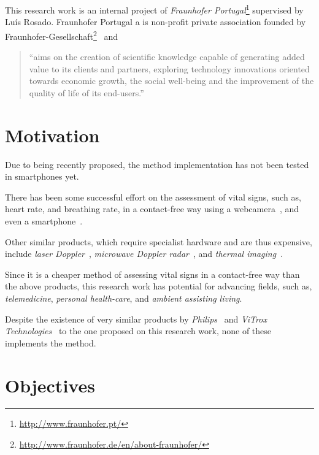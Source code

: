 This research work is an internal project of \emph{Fraunhofer
Portugal}\footnote{\url{http://www.fraunhofer.pt/}} supervised by
Luís Rosado. Fraunhofer Portugal a is non-profit private association
founded by Fraunhofer-Gesellschaft\footnote{\url{http://www.fraunhofer.de/en/about-fraunhofer/}}~\cite{Fraunhofer2013} and

\begin{quote}
  ``aims on the creation of scientific knowledge capable of
  generating added value to its clients and partners, exploring
  technology innovations oriented towards economic growth, the
  social well-being and the improvement of the quality of life of
  its end-users.''~\cite{Fraunhofer2013}
\end{quote}

\section{Motivation} \label{sec:intro:motivation}


Due to being recently proposed, the \evm{} method implementation
has not been tested in smartphones yet.

There has been some successful effort on the assessment of vital
signs, such as, heart rate, and breathing rate, in a contact-free
way using a webcamera~\cite{Wu2012Eulerian, Poh2010Non, Poh2011Advancements},
and even a smartphone~\cite{Vitrox2013, Philips2013}.

Other similar products, which require specialist hardware and are
thus expensive, include \emph{laser Doppler}~\cite{Ulyanov1993Pulse},
\emph{microwave Doppler radar}~\cite{Greneker1997Radar}, and
\emph{thermal imaging}~\cite{Garbey2007Contact}.

Since it is a cheaper method of assessing vital signs in a
contact-free way than the above products, this research work has
potential for advancing fields, such as, \emph{telemedicine},
\emph{personal health-care}, and \emph{ambient assisting living}.

Despite the existence of very similar products by
\emph{Philips}~\cite{Philips2013} and
\emph{ViTrox Technologies}~\cite{Vitrox2013}
to the one proposed on this research work, none of these implements
the \evm{} method.

\section{Objectives} \label{sec:intro:objectives}

